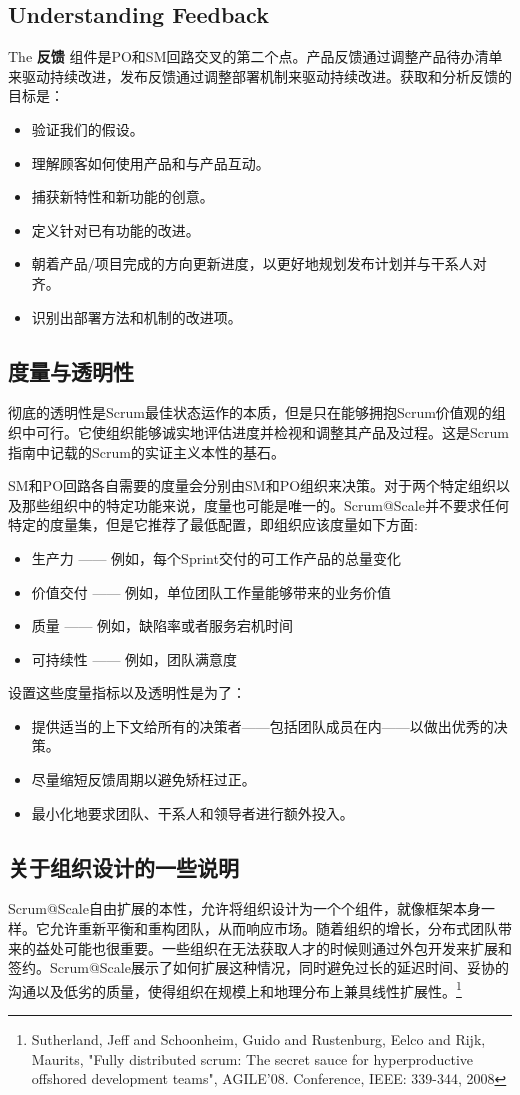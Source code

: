 \documentclass[12pt,a4paper,parskip=full]{scrartcl}
\begin{document}
\begin{CJK*}{UTF8}{gbsn}
\subsection{Understanding Feedback}
The \textbf{反馈} 组件是PO和SM回路交叉的第二个点。产品反馈通过调整产品待办清单来驱动持续改进，发布反馈通过调整部署机制来驱动持续改进。获取和分析反馈的目标是：
\begin{itemize}
\item 验证我们的假设。
\item 理解顾客如何使用产品和与产品互动。
\item 捕获新特性和新功能的创意。
\item 定义针对已有功能的改进。
\item 朝着产品/项目完成的方向更新进度，以更好地规划发布计划并与干系人对齐。
\item 识别出部署方法和机制的改进项。
\end{itemize}

\subsection{度量与透明性}
彻底的透明性是Scrum最佳状态运作的本质，但是只在能够拥抱Scrum价值观的组织中可行。它使组织能够诚实地评估进度并检视和调整其产品及过程。这是Scrum指南中记载的Scrum的实证主义本性的基石。

SM和PO回路各自需要的度量会分别由SM和PO组织来决策。对于两个特定组织以及那些组织中的特定功能来说，度量也可能是唯一的。Scrum@Scale并不要求任何特定的度量集，但是它推荐了最低配置，即组织应该度量如下方面:
\begin{itemize}
\item 生产力 —— 例如，每个Sprint交付的可工作产品的总量变化
\item 价值交付 —— 例如，单位团队工作量能够带来的业务价值
\item 质量 —— 例如，缺陷率或者服务宕机时间
\item 可持续性 —— 例如，团队满意度
\end{itemize}
设置这些度量指标以及透明性是为了：
\begin{itemize}
  \item 提供适当的上下文给所有的决策者——包括团队成员在内——以做出优秀的决策。
\item 尽量缩短反馈周期以避免矫枉过正。
\item 最小化地要求团队、干系人和领导者进行额外投入。
 \end{itemize}
 
 \subsection{关于组织设计的一些说明}
Scrum@Scale自由扩展的本性，允许将组织设计为一个个组件，就像框架本身一样。它允许重新平衡和重构团队，从而响应市场。随着组织的增长，分布式团队带来的益处可能也很重要。一些组织在无法获取人才的时候则通过外包开发来扩展和签约。Scrum@Scale展示了如何扩展这种情况，同时避免过长的延迟时间、妥协的沟通以及低劣的质量，使得组织在规模上和地理分布上兼具线性扩展性。\footnote{Sutherland, Jeff and Schoonheim,
Guido and Rustenburg, Eelco and Rijk, Maurits, "Fully distributed scrum:
The secret sauce for hyperproductive offshored development teams",
AGILE'08. Conference, IEEE: 339-344, 2008}


\end{CJK*}
\end{document}
